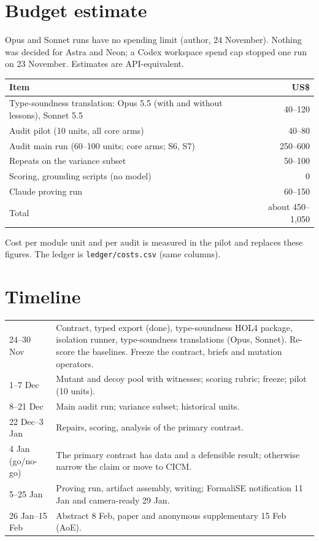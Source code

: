 \documentclass[11pt,a4paper]{article}
\newcommand{\code}[1]{\texttt{#1}}
\begin{document}
\section{Budget estimate}
Opus and Sonnet runs have no spending limit (author, 24 November). Nothing was decided for Astra and Neon; a Codex workspace spend cap stopped one run on 23 November. Estimates are API-equivalent.
\begin{tabularx}{\textwidth}{@{}Xr@{}}
\toprule
Item & US\$\\
\midrule
Type-soundness translation: Opus 5.5 (with and without lessons), Sonnet 5.5 & 40--120\\
Audit pilot (10 units, all core arms) & 40--80\\
Audit main run (60--100 units; core arms; S6, S7) & 250--600\\
Repeats on the variance subset & 50--100\\
Scoring, grounding scripts (no model) & 0\\
Claude proving run & 60--150\\
\midrule
Total & about 450--1{,}050\\
\bottomrule
\end{tabularx}
Cost per module unit and per audit is measured in the pilot and replaces these figures. The ledger is \code{ledger/costs.csv} (same columns).

\section{Timeline}
\begin{tabularx}{\textwidth}{@{}lX@{}}
\toprule
24--30 Nov & Contract, typed export (done), type-soundness HOL4 package, isolation runner, type-soundness translations (Opus, Sonnet). Re-score the baselines. Freeze the contract, briefs and mutation operators.\\
1--7 Dec & Mutant and decoy pool with witnesses; scoring rubric; freeze; pilot (10 units).\\
8--21 Dec & Main audit run; variance subset; historical units.\\
22 Dec--3 Jan & Repairs, scoring, analysis of the primary contrast.\\
4 Jan (go/no-go) & The primary contrast has data and a defensible result; otherwise narrow the claim or move to CICM.\\
5--25 Jan & Proving run, artifact assembly, writing; FormaliSE notification 11 Jan and camera-ready 29 Jan.\\
26 Jan--15 Feb & Abstract 8 Feb, paper and anonymous supplementary 15 Feb (AoE).\\
\bottomrule
\end{tabularx}
\end{document}
